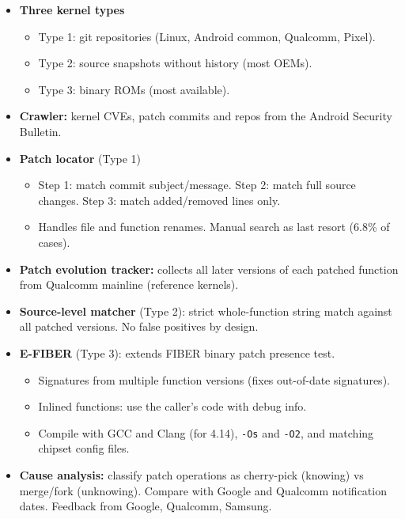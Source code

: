 \documentclass[11pt,a4paper]{article}
\begin{document}
\begin{enumerate}
    \begin{itemize}
        \item \textbf{Three kernel types}
        \begin{itemize}
            \item Type 1: git repositories (Linux, Android common, Qualcomm, Pixel).
            \item Type 2: source snapshots without history (most OEMs).
            \item Type 3: binary ROMs (most available).
        \end{itemize}
        \item \textbf{Crawler:} kernel CVEs, patch commits and repos from the Android Security Bulletin.
        \item \textbf{Patch locator} (Type 1)
        \begin{itemize}
            \item Step 1: match commit subject/message. Step 2: match full source changes. Step 3: match added/removed lines only.
            \item Handles file and function renames. Manual search as last resort (6.8\% of cases).
        \end{itemize}
        \item \textbf{Patch evolution tracker:} collects all later versions of each patched function from Qualcomm mainline (reference kernels).
        \item \textbf{Source-level matcher} (Type 2): strict whole-function string match against all patched versions. No false positives by design.
        \item \textbf{E-FIBER} (Type 3): extends FIBER binary patch presence test.
        \begin{itemize}
            \item Signatures from multiple function versions (fixes out-of-date signatures).
            \item Inlined functions: use the caller's code with debug info.
            \item Compile with GCC and Clang (for 4.14), \texttt{-Os} and \texttt{-O2}, and matching chipset config files.
        \end{itemize}
        \item \textbf{Cause analysis:} classify patch operations as cherry-pick (knowing) vs merge/fork (unknowing). Compare with Google and Qualcomm notification dates. Feedback from Google, Qualcomm, Samsung.
    \end{itemize}


\end{enumerate}
\end{document}
